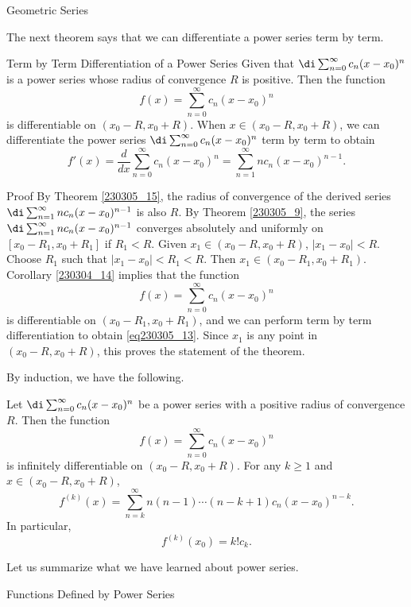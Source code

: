 \begin{example}[label=230305_16]{Geometric Series}
\begin{example}[label=230304_9]{}
The next theorem says  that we can differentiate a power series term by term.
\begin{theorem}{Term by Term Differentiation of a Power Series}
Given that   $\di \sum_{n=0}^{\infty}c_n(x-x_0)^n$ is a power series whose radius of convergence $R$ is positive. 
Then the   function
\[f(x)=\sum_{n=0}^{\infty}c_n(x-x_0)^n\] is   differentiable on $(x_0-R, x_0+R)$. When $x\in (x_0-R, x_0+R)$,
  we can differentiate the power series  $\di \sum_{n=0}^{\infty}c_n(x-x_0)^n$ term by term to obtain
\begin{equation}\label{eq230305_13}f'(x)=\frac{d}{dx}\sum_{n=0}^{\infty}c_n(x-x_0)^n =\sum_{n=1}^{\infty}nc_n (x-x_0)^{n-1}.\end{equation}
 
\end{theorem}


\begin{myproof}{Proof}
By Theorem \ref{230305_15}, the radius of convergence of the derived series $\di \sum_{n=1}^{\infty}nc_n (x-x_0)^{n-1}$ is also $R$. By Theorem \ref{230305_9}, the series  $\di\sum_{n=1}^{\infty}nc_n (x-x_0)^{n-1}$ converges absolutely and uniformly on $[x_0-R_1, x_0+R_1]$ if $R_1<R$. Given $x_1\in (x_0-R, x_0+R)$, $|x_1-x_0|<R$. Choose $R_1$ such that $|x_1-x_0|<R_1<R$. Then $x_1\in (x_0-R_1, x_0+R_1)$. Corollary \ref{230304_14} implies that the function\bp
\[ f(x)=\sum_{n=0}^{\infty}c_n(x-x_0)^n\]   is differentiable on  $(x_0-R_1, x_0+R_1)$, and we can perform term by term differentiation to obtain \eqref{eq230305_13}.  Since $x_1$ is any point in $(x_0-R, x_0+R)$, this proves the statement of the theorem.
\end{myproof}

By induction, we have the following.
\begin{corollary}[label=230305_19]{}
Let $\di\sum_{n=0}^{\infty}c_n(x-x_0)^n$ be a power series with a positive radius of convergence $R$. Then the function
\[f(x)=\sum_{n=0}^{\infty}c_n(x-x_0)^n\] is infinitely differentiable on $(x_0-R, x_0+R)$.
 For any $k\geq 1$ and $x\in (x_0-R, x_0+R)$,
\begin{equation}\label{eq230305_14}f^{(k)}(x) = \sum_{n=k}^{\infty}n(n-1)\cdots (n-k+1)c_n(x-x_0)^{n-k}.\end{equation}
In particular,
\[f^{(k)}(x_0)=k!c_k.\]
\end{corollary}
Let us summarize what we have learned about power series.
\begin{highlight}{Functions Defined by Power Series}



\end{highlight}
\end{example}
\end{example}
